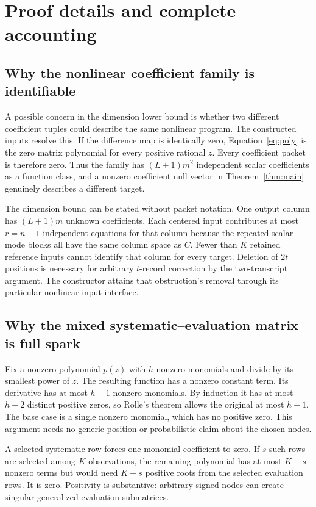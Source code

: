 \documentclass[11pt,letterpaper]{article}
\theoremstyle{remark}\newtheorem{remark}{Remark}[section]
\begin{document}
\par\bigskip
\appendix
\section{Proof details and complete accounting}
\label{app:proofs}
\subsection{Why the nonlinear coefficient family is identifiable}
A possible concern in the dimension lower bound is whether two different coefficient tuples could describe the same nonlinear program. The constructed inputs resolve this. If the difference map is identically zero, Equation~\eqref{eq:poly} is the zero matrix polynomial for every positive rational $z$. Every coefficient packet is therefore zero. Thus the family has $(L+1)m^2$ independent scalar coefficients as a function class, and a nonzero coefficient null vector in Theorem~\ref{thm:main} genuinely describes a different target.

The dimension bound can be stated without packet notation. One output column has $(L+1)m$ unknown coefficients. Each centered input contributes at most $r=n-1$ independent equations for that column because the repeated scalar-mode blocks all have the same column space as $C$. Fewer than $K$ retained reference inputs cannot identify that column for every target. Deletion of $2t$ positions is necessary for arbitrary $t$-record correction by the two-transcript argument. The constructor attains that obstruction's removal through its particular nonlinear input interface.

\subsection{Why the mixed systematic--evaluation matrix is full spark}
Fix a nonzero polynomial $p(z)$ with $h$ nonzero monomials and divide by its smallest power of $z$. The resulting function has a nonzero constant term. Its derivative has at most $h-1$ nonzero monomials. By induction it has at most $h-2$ distinct positive zeros, so Rolle's theorem allows the original at most $h-1$. The base case is a single nonzero monomial, which has no positive zero. This argument needs no generic-position or probabilistic claim about the chosen nodes.

A selected systematic row forces one monomial coefficient to zero. If $s$ such rows are selected among $K$ observations, the remaining polynomial has at most $K-s$ nonzero terms but would need $K-s$ positive roots from the selected evaluation rows. It is zero. Positivity is substantive: arbitrary signed nodes can create singular generalized evaluation submatrices.
\end{document}
